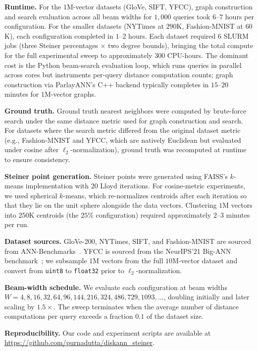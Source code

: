 \textbf{Runtime.}
For the $1$M-vector datasets (GloVe, SIFT, YFCC), graph construction and search evaluation across all beam widths for $1{,}000$ queries took $6$--$7$ hours per configuration. For the smaller datasets (NYTimes at $290$K, Fashion-MNIST at $60$K), each configuration completed in $1$--$2$ hours. Each dataset required $6$ SLURM jobs (three Steiner percentages $\times$ two degree bounds), bringing the total compute for the full experimental sweep to approximately $300$ CPU-hours. The dominant cost is the Python beam-search evaluation loop, which runs queries in parallel across cores but instruments per-query distance computation counts; graph construction via ParlayANN's C++ backend typically completes in $15$--$20$ minutes for $1$M-vector graphs.

\textbf{Ground truth.}
Ground truth nearest neighbors were computed by brute-force search under the same distance metric used for graph construction and search. For datasets where the search metric differed from the original dataset metric (e.g., Fashion-MNIST and YFCC, which are natively Euclidean but evaluated under cosine after $\ell_2$-normalization), ground truth was recomputed at runtime to ensure consistency.

\textbf{Steiner point generation.}
Steiner points were generated using FAISS's $k$-means implementation with $20$ Lloyd iterations. For cosine-metric experiments, we used spherical $k$-means, which re-normalizes centroids after each iteration so that they lie on the unit sphere alongside the data vectors. Clustering $1$M vectors into $250$K centroids (the $25\%$ configuration) required approximately $2$--$3$ minutes per run.

\textbf{Dataset sources.}
GloVe-200, NYTimes, SIFT, and Fashion-MNIST are sourced from ANN-Benchmarks~\cite{aumuller2020ann}. YFCC is sourced from the NeurIPS'21 Big-ANN benchmark~\cite{simhadri2022results}; we subsample $1$M vectors from the full $10$M-vector dataset and convert from \texttt{uint8} to \texttt{float32} prior to $\ell_2$-normalization.

\textbf{Beam-width schedule.}
We evaluate each configuration at beam widths $W = 4, 8, 16, 32, 64, 96, 144, 216, 324, 486, 729, 1093, \ldots$, doubling initially and later scaling by $1.5\times$. The sweep terminates when the average number of distance computations per query exceeds a fraction $0.1$ of the dataset size.

\textbf{Reproducibility.}
Our code and experiment scripts are available at \url{https://github.com/purnadutta/diskann_steiner}.


